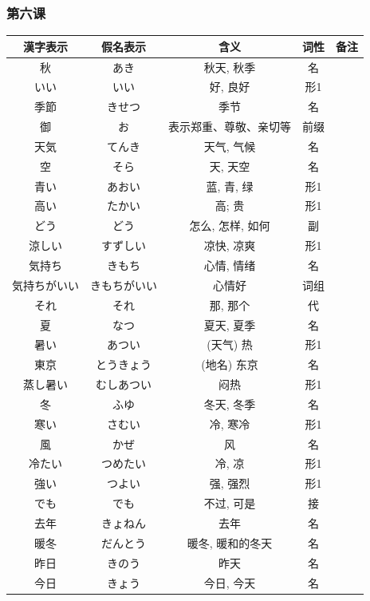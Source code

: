 \subsubsection{第六课}
\begin{longtable}{|c|c|c|c|c|}
    \hline
漢字表示 & 假名表示  & 含义 & 词性 & 备注 \\ \hline\hline  
秋 & あき & 秋天, 秋季 & 名 & \\ \hline
いい & いい & 好, 良好 & 形1 & \\ \hline
季節 & きせつ & 季节 & 名 & \\ \hline
御 & お & 表示郑重、尊敬、亲切等 & 前缀 & \\ \hline
天気 & てんき & 天气, 气候 & 名 & \\ \hline
空 & そら & 天, 天空 & 名 & \\ \hline
青い & あおい & 蓝, 青, 绿 & 形1 & \\ \hline
高い & たかい & 高; 贵 & 形1 & \\ \hline
どう & どう & 怎么, 怎样, 如何 & 副 & \\ \hline
涼しい & すずしい & 凉快, 凉爽 & 形1 & \\ \hline
気持ち & きもち & 心情, 情绪 & 名 & \\ \hline
気持ちがいい & きもちがいい & 心情好 & 词组 & \\ \hline
それ & それ & 那, 那个 & 代 & \\ \hline
夏 & なつ & 夏天, 夏季 & 名 & \\ \hline
暑い & あつい & (天气) 热 & 形1 & \\ \hline
東京 & とうきょう & (地名) 东京 & 名 & \\ \hline
蒸し暑い & むしあつい & 闷热 & 形1 & \\ \hline
冬 & ふゆ & 冬天, 冬季 & 名 & \\ \hline
寒い & さむい & 冷, 寒冷 & 形1 & \\ \hline
風 & かぜ & 风 & 名 & \\ \hline
冷たい & つめたい & 冷, 凉 & 形1 & \\ \hline
強い & つよい & 强, 强烈 & 形1 & \\ \hline
でも & でも & 不过, 可是 & 接 & \\ \hline
去年 & きょねん & 去年 & 名 & \\ \hline
暖冬 & だんとう & 暖冬, 暖和的冬天 & 名 & \\ \hline
昨日 & きのう & 昨天 & 名 & \\ \hline
今日 & きょう & 今日, 今天 & 名 & \\ \hline

\end{longtable}
